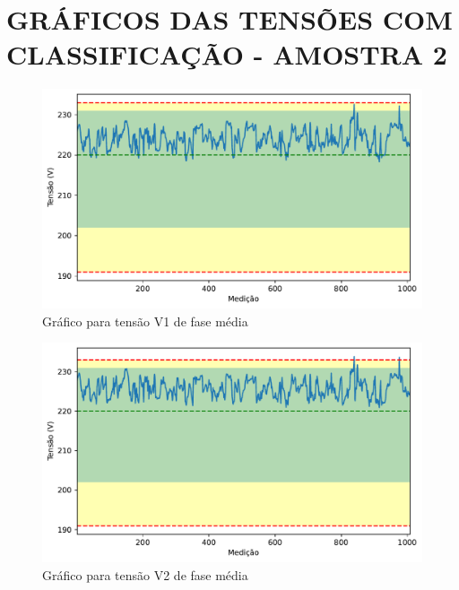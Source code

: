 \chapter{GRÁFICOS DAS TENSÕES COM CLASSIFICAÇÃO - AMOSTRA 2}
\label{ap:graficos_a2}

\begin{figure}[H]
	\centering
	\caption{Gráfico para tensão V1 de fase média}
    \includegraphics[width=16cm]{illustrations/figures/a2_V1_Avg.pdf}
\end{figure}

\begin{figure}[H]
	\centering
	\caption{Gráfico para tensão V2 de fase média}
    \includegraphics[width=16cm]{illustrations/figures/a2_V2_Avg.pdf}
\end{figure}

